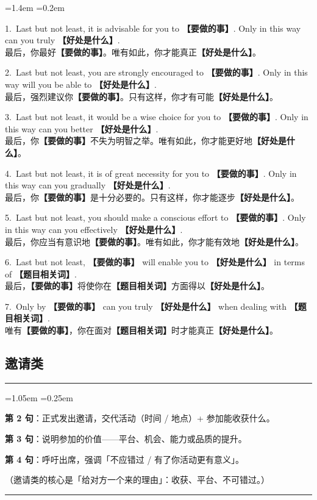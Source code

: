 \documentclass[11pt,a4paper]{ctexart}
\newcommand{\fillin}[1]{{\bfseries【#1】}}
\newenvironment{tpl}[1]{%
  \par\addvspace{7pt}\needspace{4\baselineskip}%
  \noindent{\bfseries\color{accent}#1}\par\nopagebreak
  \vspace{2pt}\noindent\rule{\linewidth}{0.7pt}\par\nopagebreak\vspace{3pt}%
  \begin{list}{}{\leftmargin=1.05em \rightmargin=0.25em \listparindent=0pt
    \itemindent=0pt \topsep=0pt \parsep=2.5pt \itemsep=2.5pt \partopsep=0pt}%
  \item\relax
}{%
  \end{list}\vspace{1pt}\noindent\rule{\linewidth}{0.7pt}\par\addvspace{8pt}%
}
\newenvironment{eg}{%
  \par\addvspace{4pt}%
  \begin{list}{}{\leftmargin=1.4em \rightmargin=0.2em \listparindent=0pt
    \itemindent=0pt \topsep=0pt \parsep=2pt \itemsep=2pt \partopsep=0pt}%
  \item\relax
}{%
  \end{list}\addvspace{5pt}%
}
\begin{document}
\begin{eg}
1.\ Last but not least, it is advisable for you to \fillin{要做的事}. Only in this way can you truly \fillin{好处是什么}.\\
最后，你最好\fillin{要做的事}。唯有如此，你才能真正\fillin{好处是什么}。

2.\ Last but not least, you are strongly encouraged to \fillin{要做的事}. Only in this way will you be able to \fillin{好处是什么}.\\
最后，强烈建议你\fillin{要做的事}。只有这样，你才有可能\fillin{好处是什么}。

3.\ Last but not least, it would be a wise choice for you to \fillin{要做的事}. Only in this way can you better \fillin{好处是什么}.\\
最后，你\fillin{要做的事}不失为明智之举。唯有如此，你才能更好地\fillin{好处是什么}。

4.\ Last but not least, it is of great necessity for you to \fillin{要做的事}. Only in this way can you gradually \fillin{好处是什么}.\\
最后，你\fillin{要做的事}是十分必要的。只有这样，你才能逐步\fillin{好处是什么}。

5.\ Last but not least, you should make a conscious effort to \fillin{要做的事}. Only in this way can you effectively \fillin{好处是什么}.\\
最后，你应当有意识地\fillin{要做的事}。唯有如此，你才能有效地\fillin{好处是什么}。

6.\ Last but not least, \fillin{要做的事} will enable you to \fillin{好处是什么} in terms of \fillin{题目相关词}.\\
最后，\fillin{要做的事}将使你在\fillin{题目相关词}方面得以\fillin{好处是什么}。

7.\ Only by \fillin{要做的事} can you truly \fillin{好处是什么} when dealing with \fillin{题目相关词}.\\
唯有\fillin{要做的事}，你在面对\fillin{题目相关词}时才能真正\fillin{好处是什么}。
\end{eg}


\subsection{邀请类}

\begin{tpl}{邀请类 · 第二段骨架}
\textbf{第 2 句}：正式发出邀请，交代活动（时间 / 地点）+ 参加能收获什么。\par
\textbf{第 3 句}：说明参加的价值——平台、机会、能力或品质的提升。\par
\textbf{第 4 句}：呼吁出席，强调「不应错过 / 有了你活动更有意义」。\par
（邀请类的核心是「给对方一个来的理由」：收获、平台、不可错过。）
\end{tpl}
\end{document}
